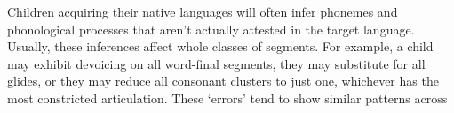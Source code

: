 \documentclass[lab={4},title={Phonetics of toddler speech},addfiller=true,turnin=false]{com310lab}
\begin{document}
\maketitle

\begin{overview}
	Children acquiring their native languages will often infer phonemes and phonological processes that aren't actually attested in the target language.
	Usually, these inferences affect whole classes of segments.
	For example, a child may exhibit devoicing on all word-final segments, they may substitute \ipa[w] for all glides, or they may reduce all consonant clusters to just one, whichever has the most constricted articulation.
	These `errors' tend to show similar patterns across
\end{overview}

\begin{problem}
	\\
\end{problem}

\begin{task}
	\\
\end{task}

\begin{writeup}
	\pagebreak
\end{writeup}

\labtitle

\begin{topic}
	\\
\end{topic}

\begin{issue}
	\\
\end{issue}

\begin{hypothesis}
	\\
\end{hypothesis}

\begin{method}
	\\
\end{method}

\begin{results}
	\\
\end{results}

\begin{discussion}
	\\
\end{discussion}
\end{document}
